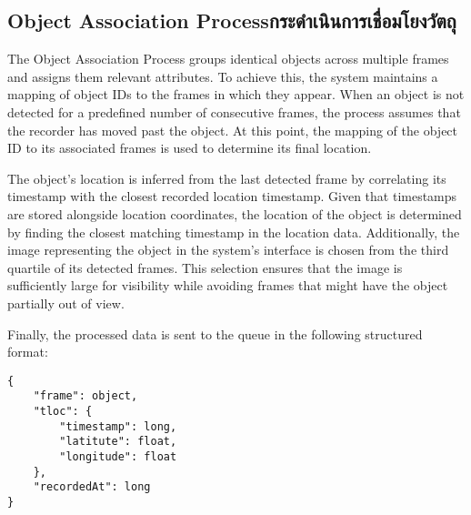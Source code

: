 \subsection{\ifenglish Object Association Process\else กระดำเนินการเชื่อมโยงวัตถุ\fi}
The Object Association Process groups identical objects across multiple frames and assigns them relevant attributes. To achieve this, the system maintains a mapping of object IDs to the frames in which they appear. When an object is not detected for a predefined number of consecutive frames, the process assumes that the recorder has moved past the object. At this point, the mapping of the object ID to its associated frames is used to determine its final location.

The object's location is inferred from the last detected frame by correlating its timestamp with the closest recorded location timestamp. Given that timestamps are stored alongside location coordinates, the location of the object is determined by finding the closest matching timestamp in the location data. Additionally, the image representing the object in the system's interface is chosen from the third quartile of its detected frames. This selection ensures that the image is sufficiently large for visibility while avoiding frames that might have the object partially out of view.

Finally, the processed data is sent to the queue in the following structured format:
\begin{lstlisting}
{
    "frame": object,
    "tloc": {
        "timestamp": long,
        "latitute": float,
        "longitude": float
    },
    "recordedAt": long
}
\end{lstlisting}